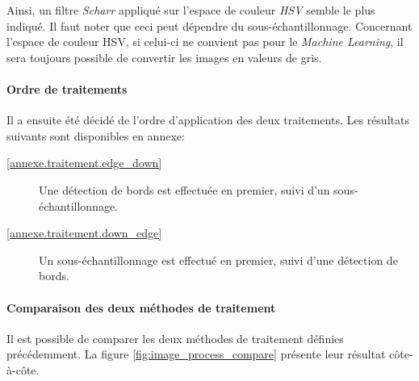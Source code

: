 Ainsi, un filtre \textit{Scharr} appliqué sur l'espace de couleur \textit{HSV} semble le plus indiqué. Il faut noter que ceci peut dépendre du sous-échantillonnage. Concernant l'espace de couleur HSV, si celui-ci ne convient pas pour le \textit{Machine Learning}, il sera toujours possible de convertir les images en valeurs de gris.

\paragraph{Ordre de traitements}

Il a ensuite été décidé de l'ordre d'application des deux traitements. Les résultats suivants sont disponibles en annexe:

\begin{description}
    \item[\ref{annexe.traitement.edge_down}] Une détection de bords est effectuée en premier, suivi d'un sous-échantillonnage.
    \item[\ref{annexe.traitement.down_edge}] Un sous-échantillonnage est effectué en premier, suivi d'une détection de bords.
\end{description}

\paragraph{Comparaison des deux méthodes de traitement}
Il est possible de comparer les deux méthodes de traitement définies précédemment. La figure \ref{fig:image_process_compare} présente leur résultat côte-à-côte.

